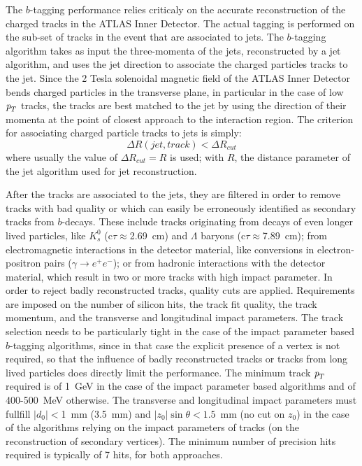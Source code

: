 The $b$-tagging performance relies criticaly on the accurate reconstruction of the charged tracks in the ATLAS Inner Detector.  The actual tagging is performed on the sub-set of tracks in the event that are associated to jets.  The $b$-tagging algorithm takes as input the three-momenta of the jets, reconstructed by a jet algorithm, and uses the jet direction to associate the charged particles tracks to the jet. Since the 2 Tesla solenoidal magnetic field of the ATLAS Inner Detector bends charged particles in the transverse plane, in particular in the case of low ${\emph{p}_{T}}$ tracks, the tracks are best matched to the jet by using the direction of their momenta at the point of closest approach to the interaction region.  The criterion for associating charged particle tracks to jets is simply:
%
\begin{equation}
\Delta R(jet, track) < \Delta R_{cut}
\end{equation}
%
where usually the value of $\Delta R_{cut} = R$ is used; with $R$, the distance parameter of the jet algorithm used for jet reconstruction.

After the tracks are associated to the jets, they are filtered in order to remove tracks with bad quality or which can easily be erroneously identified as secondary tracks from $b$-decays. These include tracks originating from decays of even longer lived particles, like $K^0_s$ (c$\tau \approx$2.69~cm) and $\Lambda$ baryons (c$\tau \approx$7.89~cm); from electromagnetic interactions in the detector material, like conversions in electron-positron pairs ($\gamma \rightarrow e^+ e^-$); or from hadronic interactions with the detector material, which result in two or more tracks with high impact parameter. 
In order to reject badly reconstructed tracks, quality cuts are applied. Requirements are imposed on the number of silicon hits, the track fit quality,  the track momentum, and the transverse and longitudinal impact parameters. The track selection needs to be particularly tight in the case of the impact parameter based $b$-tagging algorithms, since in that case the explicit presence of a vertex is not required, so that the influence of badly reconstructed tracks or tracks from long lived particles does directly limit the performance. The minimum track ${\emph{p}_{T}}$ required is of 1~GeV in the case of the impact parameter based algorithms and of 400-500~MeV otherwise. The transverse and longitudinal
impact parameters must fullfill  $|d_0|<$1~mm (3.5~mm) and $|z_0| \sin \theta < 1.5$~mm (no cut on $z_0$) in the case of the algorithms relying on the impact parameters of tracks (on the reconstruction of secondary vertices).  The minimum number of precision hits required is typically of 7 hits, for both approaches. 






